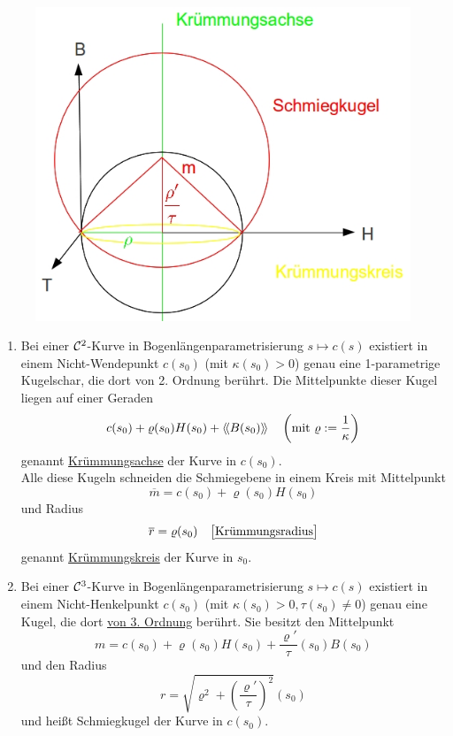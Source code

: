 \begin{satz}\label{satz137}\(\)
\begin{figure}[ht]
 \centering
 \includegraphics[scale=0.4]{Bilder/Bsp6.jpg}
\end{figure}
\begin{enumerate}
 \item Bei einer \(\mathcal{C}^2\)-Kurve in Bogenlängenparametrisierung \(s \mapsto c(s)\) existiert in einem Nicht-Wendepunkt \(c(s_0)\) (mit \(\kappa(s_0) > 0\)) genau eine 1-parametrige Kugelschar, die dort von 2. Ordnung berührt. Die Mittelpunkte dieser Kugel liegen auf einer Geraden
 \[
  c(s_0) + \varrho(s_0) H(s_0) + \left\langle\!\left\langle B(s_0) \right\rangle\!\right\rangle \quad \left(\text{mit } \varrho := \frac1{\kappa}\right)
 \]
 genannt \uline{Krümmungsachse} der Kurve in \(c(s_0)\). \\
 Alle diese Kugeln schneiden die Schmiegebene in einem Kreis mit Mittelpunkt 
 \[\overline m = c(s_0) + \varrho (s_0) H(s_0)\] 
 und Radius \[\overline r = \varrho(s_0)\quad \big[\text{\uline{Krümmungsradius}}\big]\]
  genannt \uline{Krümmungskreis} der Kurve in \(s_0\).
 \item Bei einer \(\mathcal{C}^3\)-Kurve in Bogenlängenparametrisierung \(s \mapsto c(s)\) existiert in einem Nicht-Henkelpunkt \(c(s_0)\) (mit \(\kappa(s_0) > 0, \tau(s_0) \ne 0\)) genau eine Kugel, die dort \uline{von 3. Ordnung} berührt. Sie besitzt den Mittelpunkt
 \[
  m = c(s_0) + \varrho(s_0) H(s_0) + \frac{\varrho'}{\tau}(s_0) B(s_0)
 \]
 und den Radius
 \[
  r = \sqrt{\varrho^2 + \left(\frac{\varrho'}{\tau}\right)^2}(s_0)
 \]
und heißt Schmiegkugel der Kurve in \(c(s_0)\).
\end{enumerate}
\end{satz}


